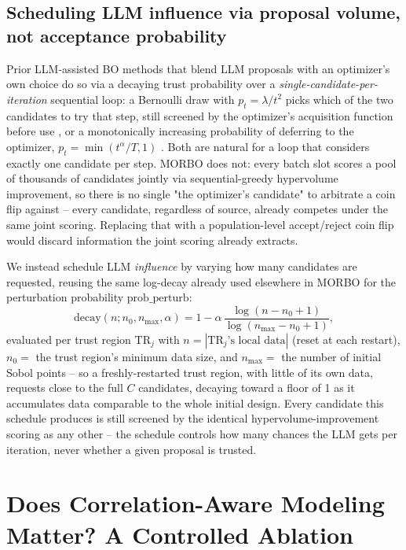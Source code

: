 \documentclass[11pt]{article}
\newcommand{\TR}{\mathrm{TR}}
\begin{document}
\subsection{Scheduling LLM influence via proposal volume, not acceptance probability}

Prior LLM-assisted BO methods that blend LLM proposals with an optimizer's
own choice do so via a decaying trust probability over a
\emph{single-candidate-per-iteration} sequential loop: a Bernoulli draw with
$p_t = \lambda/t^2$ picks which of the two candidates to try that step,
still screened by the optimizer's acquisition function before use
\citep{trustaware2026}, or a monotonically increasing probability of
deferring to the optimizer, $p_t = \min(t^\alpha/T, 1)$
\citep{autolead2025}. Both are natural for a loop that considers exactly one
candidate per step. MORBO does not: every batch slot scores a pool of
thousands of candidates jointly via sequential-greedy hypervolume
improvement, so there is no single "the optimizer's candidate" to arbitrate
a coin flip against -- every candidate, regardless of source, already
competes under the same joint scoring. Replacing that with a population-level
accept/reject coin flip would discard information the joint scoring already
extracts.

We instead schedule LLM \emph{influence} by varying how many candidates are
requested, reusing the same log-decay already used elsewhere in MORBO for
the perturbation probability $\mathrm{prob\_perturb}$:
\begin{equation}
  \mathrm{decay}(n; n_0, n_{\max}, \alpha) = 1 - \alpha\,
    \frac{\log(n - n_0 + 1)}{\log(n_{\max} - n_0 + 1)},
\end{equation}
evaluated per trust region $\TR_j$ with $n = |\TR_j\text{'s local data}|$
(reset at each restart), $n_0 = $ the trust region's minimum data size, and
$n_{\max} = $ the number of initial Sobol points -- so a freshly-restarted
trust region, with little of its own data, requests close to the full
$C$ candidates, decaying toward a floor of 1 as it accumulates data
comparable to the whole initial design. Every candidate this schedule
produces is still screened by the identical hypervolume-improvement scoring
as any other -- the schedule controls how many chances the LLM gets per
iteration, never whether a given proposal is trusted.

\section{Does Correlation-Aware Modeling Matter? A Controlled Ablation}
\label{sec:kronecker-ablation}
\end{document}
